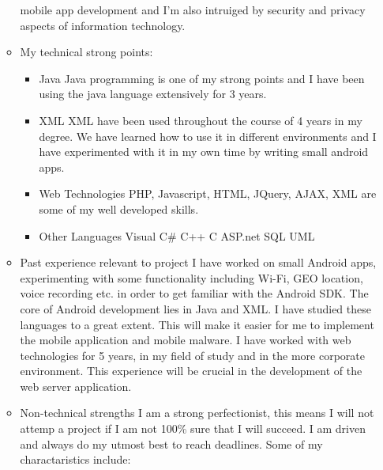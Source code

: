 \documentclass[12pt, oneside]{article}
\begin{document}
\begin{enumerate}
\begin{itemize}
				mobile app development and I'm also intruiged by security and privacy aspects of information technology.\newline
			\item My technical strong points:
				\begin{itemize}
				\item Java\newline
					Java programming is one of my strong points and I have been using the java language extensively for 3 years.
				\item XML\newline
					XML have been used throughout the course of 4 years in my degree. We have learned how to use it 
					in different environments and I have experimented with it in my own time by writing small android apps.
				\item Web Technologies\newline
					PHP, Javascript, HTML, JQuery, AJAX, XML are some of my well developed skills.
				\item Other Languages\newline
					Visual C\#\newline
					C++\newline
					C\newline
					ASP.net\newline
					SQL\newline
					UML\newline	
				\end{itemize}				
			\item Past experience relevant to project\newline\newline
				I have worked on small Android apps, experimenting with some functionality including Wi-Fi, GEO location, voice recording etc. in order to get familiar with the Android SDK. The core of Android development lies in Java and XML. I have studied these languages to a great extent. This will make it easier for me to implement the mobile application and mobile malware.  I have worked with web technologies for 5 years, in my field of study and in the more corporate environment. This experience will be crucial in the development of the web server application.\newline
			\item Non-technical strengths\newline\newline
				I am  a strong perfectionist, this means I will not attemp a project if I am not 100\% sure that I will succeed. I am driven and always do my utmost best to reach deadlines.  Some of my charactaristics include:\newline 

\end{itemize}
\end{enumerate}
\end{document}

